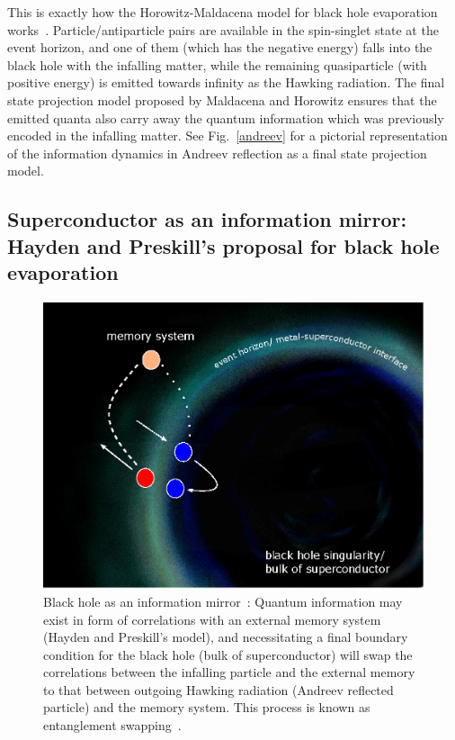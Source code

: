\documentclass[10pt,letterpaper,aps,onecolumn,superscriptaddress,floatfix,notitlepage]{revtex4-1}
\begin{document}
	This is exactly how the Horowitz-Maldacena model for black hole evaporation works~\cite{horowitz}. Particle/antiparticle pairs are available in the spin-singlet state at the event horizon, and one of them (which has the negative energy) falls into the black hole with the infalling matter, while the remaining quasiparticle (with positive energy) is emitted towards infinity as the Hawking radiation. The final state projection model proposed by Maldacena and Horowitz ensures that the emitted quanta also carry away the quantum information which was previously encoded in the infalling matter. See Fig.~\ref{andreev} for a pictorial representation of the information dynamics in Andreev reflection as a final state projection model.
	\subsection{Superconductor as an information mirror: Hayden and Preskill's proposal for black hole evaporation}
	\begin{figure}
		\includegraphics[scale=0.6]{fig4.eps}
		\caption{Black hole as an information mirror~\cite{projection,preskill}: Quantum information may exist in form of correlations with an external memory system (Hayden and Preskill's model), and necessitating a final boundary condition for the black hole (bulk of superconductor) will swap the correlations between the infalling particle and the external memory to that between outgoing Hawking radiation (Andreev reflected particle) and the memory system. This process is known as entanglement swapping~\cite{zukowski1993event}.\label{mirror}}
	\end{figure}    
\end{document}
